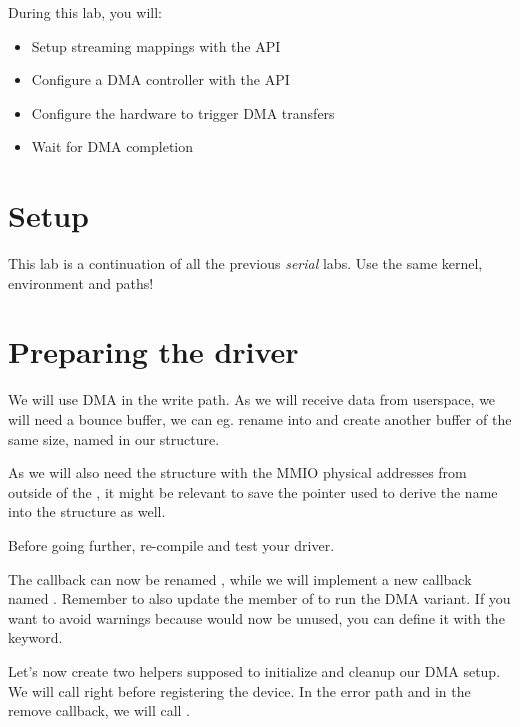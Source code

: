 
During this lab, you will:

\begin{itemize}
\item Setup streaming mappings with the  API
\item Configure a DMA controller with the  API
\item Configure the hardware to trigger DMA transfers
\item Wait for DMA completion
\end{itemize}

\section{Setup}

This lab is a continuation of all the previous {\em serial} labs. Use
the same kernel, environment and paths!

\section{Preparing the driver}

We will use DMA in the write path. As we will receive data from
userspace, we will need a bounce buffer, we can eg. rename 
into  and create another buffer of the same size, named
 in our  structure.

As we will also need the  structure with the MMIO physical
addresses from outside of the , it might be relevant to save
the  pointer used to derive the  name into the
 structure as well.

Before going further, re-compile and test your driver.

The  callback can now be renamed ,
while we will implement a new callback named
. Remember to also update the 
member of  to run the DMA variant. If you want to
avoid warnings because  would now be unused, you
can define it with the  keyword.

Let's now create two helpers supposed to initialize and cleanup our DMA
setup. We will call  right before registering
the  device. In the  error path and in the
remove callback, we will call .

